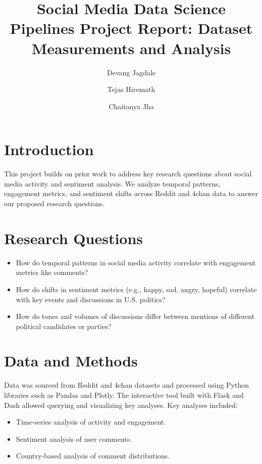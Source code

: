 \documentclass[sigconf]{acmart}
\begin{document}
\title{Social Media Data Science Pipelines Project Report: Dataset Measurements and Analysis}

\author{Devang Jagdale}

\author{Tejas Hiremath}

\author{Chaitanya Jha}

\maketitle

\section{Introduction}
This project builds on prior work to address key research questions about social media activity and sentiment analysis. We analyze temporal patterns, engagement metrics, and sentiment shifts across Reddit and 4chan data to answer our proposed research questions.

\section{Research Questions}
\begin{itemize}
    \item How do temporal patterns in social media activity correlate with engagement metrics like comments?
    \item How do shifts in sentiment metrics (e.g., happy, sad, angry, hopeful) correlate with key events and discussions in U.S. politics?
    \item How do tones and volumes of discussions differ between mentions of different political candidates or parties?
\end{itemize}

\section{Data and Methods}
Data was sourced from Reddit and 4chan datasets and processed using Python libraries such as Pandas and Plotly. The interactive tool built with Flask and Dash allowed querying and visualizing key analyses. Key analyses included:
\begin{itemize}
    \item Time-series analysis of activity and engagement.
    \item Sentiment analysis of user comments.
    \item Country-based analysis of comment distributions.
\end{itemize}
\end{document}

